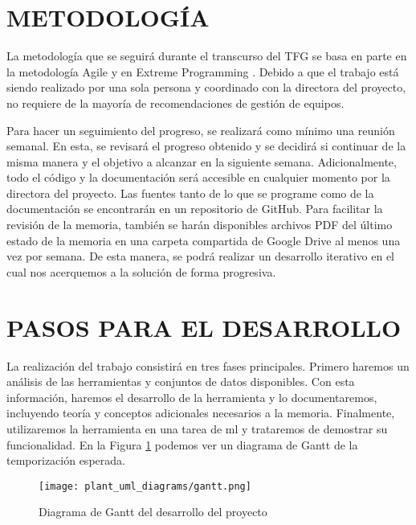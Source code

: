 \section{METODOLOGÍA}

La metodología que se seguirá durante el transcurso del TFG se basa en parte en la metodología Agile y en Extreme Programming \cite{extremeprogramming}. Debido a que el trabajo está siendo realizado por una sola persona y coordinado con la directora del proyecto, no requiere de la mayoría de recomendaciones de gestión de equipos. 

Para hacer un seguimiento del progreso, se realizará como mínimo una reunión semanal. En esta, se revisará el progreso obtenido y se decidirá si continuar de la misma manera y el objetivo a alcanzar en la siguiente semana. Adicionalmente, todo el código y la documentación será accesible en cualquier momento por la directora del proyecto. Las fuentes tanto de lo que se programe como de la documentación se encontrarán en un repositorio de GitHub. Para facilitar la revisión de la memoria, también se harán disponibles archivos PDF del último estado de la memoria en una carpeta compartida de Google Drive al menos una vez por semana. De esta manera, se podrá realizar un desarrollo iterativo en el cual nos acerquemos a la solución de forma progresiva.

\section{PASOS PARA EL DESARROLLO}

La realización del trabajo consistirá en tres fases principales. Primero haremos un análisis de las herramientas y conjuntos de datos disponibles. Con esta información, haremos el desarrollo de la herramienta y lo documentaremos, incluyendo teoría y conceptos adicionales necesarios a la memoria. Finalmente, utilizaremos la herramienta en una tarea de \gls{ml} y trataremos de demostrar su funcionalidad. En la Figura \ref{fig:gantt} podemos ver un diagrama de Gantt de la temporización esperada.

\begin{figure}[H]
  \begin{center}
    \texttt{[image: plant\_uml\_diagrams/gantt.png]}
  \end{center}
  \caption{Diagrama de Gantt del desarrollo del proyecto}\label{fig:gantt}
\end{figure}
